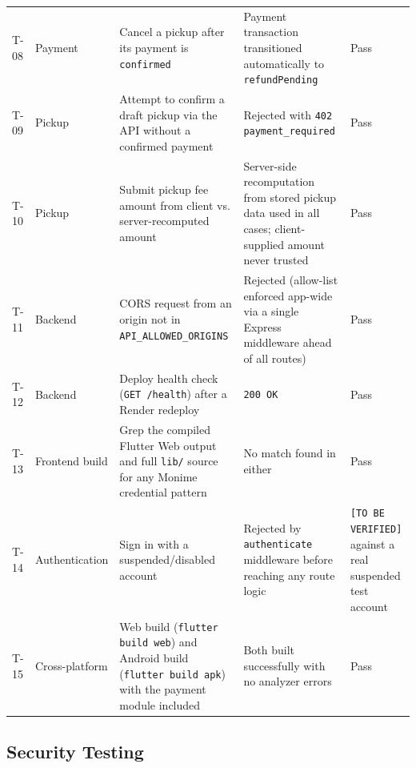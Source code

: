\begin{longtable}{@{}p{1.1cm}p{2.6cm}p{4.4cm}p{4.4cm}p{1.4cm}@{}}
T-08 & Payment & Cancel a pickup after its payment is \texttt{confirmed} & Payment transaction transitioned automatically to \texttt{refundPending} & Pass \\
T-09 & Pickup & Attempt to confirm a draft pickup via the API without a confirmed payment & Rejected with \texttt{402 payment\_required} & Pass \\
T-10 & Pickup & Submit pickup fee amount from client vs. server-recomputed amount & Server-side recomputation from stored pickup data used in all cases; client-supplied amount never trusted & Pass \\
T-11 & Backend & CORS request from an origin not in \texttt{API\_ALLOWED\_ORIGINS} & Rejected (allow-list enforced app-wide via a single Express middleware ahead of all routes) & Pass \\
T-12 & Backend & Deploy health check (\texttt{GET~/health}) after a Render redeploy & \texttt{200~OK} & Pass \\
T-13 & Frontend build & Grep the compiled Flutter Web output and full \texttt{lib/} source for any Monime credential pattern & No match found in either & Pass \\
T-14 & Authentication & Sign in with a suspended/disabled account & Rejected by \texttt{authenticate} middleware before reaching any route logic & \texttt{[TO BE VERIFIED]} against a real suspended test account \\
T-15 & Cross-platform & Web build (\texttt{flutter build web}) and Android build (\texttt{flutter build apk}) with the payment module included & Both built successfully with no analyzer errors & Pass \\
\bottomrule
\end{longtable}

\subsection{Security Testing}

